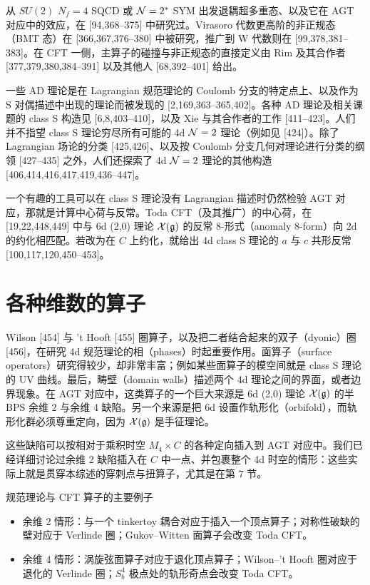  从 $SU(2)$ $N_f=4$ SQCD 或 $\mathcal{N}=2^*$ SYM 出发退耦超多重态、以及它在 AGT 对应中的效应，在 [94,368--375] 中研究过。Virasoro 代数更高阶的非正规态（BMT 态）在 [366,367,376--380] 中被研究，推广到 W 代数则在 [99,378,381--383]。在 CFT 一侧，主算子的碰撞与非正规态的直接定义由 Rim 及其合作者 [377,379,380,384--391] 以及其他人 [68,392--401] 给出。

 一些 AD 理论是在 Lagrangian 规范理论的 Coulomb 分支的特定点上、以及作为 S 对偶描述中出现的理论而被发现的 [2,169,363--365,402]。各种 AD 理论及相关课题的 class S 构造见 [6,8,403--410]，以及 Xie 与其合作者的工作 [411--423]。人们并不指望 class S 理论穷尽所有可能的 4d $\mathcal{N}=2$ 理论（例如见 [424]）。除了 Lagrangian 场论的分类 [425,426]、以及按 Coulomb 分支几何对理论进行分类的纲领 [427--435] 之外，人们还探索了 4d $\mathcal{N}=2$ 理论的其他构造 [406,414,416,417,419,436--447]。

一个有趣的工具可以在 class S 理论没有 Lagrangian 描述时仍然检验 AGT 对应，那就是计算中心荷与反常。Toda CFT（及其推广）的中心荷，在 [19,22,448,449] 中与 6d (2,0) 理论 $\mathcal{X}(\mathfrak{g})$ 的反常 8-形式（anomaly 8-form）向 2d 的约化相匹配。若改为在 $C$ 上约化，就给出 4d class S 理论的 $a$ 与 $c$ 共形反常 [100,117,120,450--453]。

\section{各种维数的算子}

Wilson [454] 与 't Hooft [455] 圈算子，以及把二者结合起来的双子（dyonic）圈 [456]，在研究 4d 规范理论的相（phases）时起重要作用。面算子（surface operators）研究得较少，却非常丰富；例如某些面算子的模空间就是 class S 理论的 UV 曲线。最后，畴壁（domain walls）描述两个 4d 理论之间的界面，或者边界现象。在 AGT 对应中，这类算子的一个巨大来源是 6d (2,0) 理论 $\mathcal{X}(\mathfrak{g})$ 的半 BPS 余维 2 与余维 4 缺陷。另一个来源是把 6d 设置作轨形化（orbifold），而轨形化群必须尊重定向，因为 $\mathcal{X}(\mathfrak{g})$ 是手征理论。

这些缺陷可以按相对于乘积时空 $M_4\times C$ 的各种定向插入到 AGT 对应中。我们已经详细讨论过余维 2 缺陷插入在 $C$ 中一点、并包裹整个 4d 时空的情形：这些实际上就是贯穿本综述的穿刺点与扭算子，尤其是在第 7 节。

\begin{keybox}{规范理论与 CFT 算子的主要例子}
\begin{itemize}[leftmargin=1.4em,itemsep=1pt,topsep=1pt]
  \item 余维 2 情形：与一个 tinkertoy 耦合对应于插入一个顶点算子；对称性破缺的壁对应于 Verlinde 圈；Gukov--Witten 面算子会改变 Toda CFT。
  \item 余维 4 情形：涡旋弦面算子对应于退化顶点算子；Wilson--'t Hooft 圈对应于退化的 Verlinde 圈；$S^4_b$ 极点处的轨形奇点会改变 Toda CFT。
\end{itemize}
\end{keybox}


